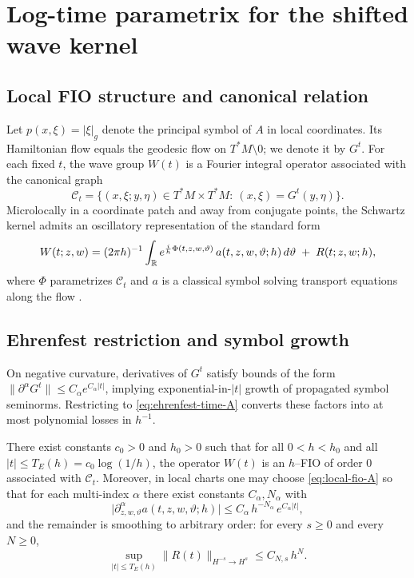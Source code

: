 \section{Log-time parametrix for the shifted wave kernel}\label{sec:ch5-parametrix}

\subsection{Local FIO structure and canonical relation}\label{subsec:ch5-fio}

Let $p(x,\xi)=|\xi|_g$ denote the principal symbol of $A$ in local coordinates. Its Hamiltonian flow equals the
geodesic flow on $T^*M\setminus 0$; we denote it by $G^t$. For each fixed $t$, the wave group $W(t)$ is a Fourier
integral operator associated with the canonical graph
\[
\mathcal C_t=\{(x,\xi;y,\eta)\in T^*M\times T^*M:\ (x,\xi)=G^t(y,\eta)\}.
\]
Microlocally in a coordinate patch and away from conjugate points, the Schwartz kernel admits an oscillatory
representation of the standard form
\begin{equation}\label{eq:local-fio-A}
W(t;z,w)
=(2\pi h)^{-1}\int_{\mathbb{R}} e^{\frac{i}{h}\Phi(t,z,w,\vartheta)}\,a(t,z,w,\vartheta;h)\,d\vartheta
\;+\;R(t;z,w;h),
\end{equation}
where $\Phi$ parametrizes $\mathcal C_t$ and $a$ is a classical symbol solving transport equations along the flow
\cite[Vol.~IV]{Hormander1985}.

\subsection{Ehrenfest restriction and symbol growth}\label{subsec:ch5-ehrenfest}

On negative curvature, derivatives of $G^t$ satisfy bounds of the form
$\|\partial^\alpha G^t\|\le C_\alpha e^{C_\alpha|t|}$, implying exponential-in-$|t|$ growth of propagated symbol
seminorms. Restricting to \eqref{eq:ehrenfest-time-A} converts these factors into at most polynomial losses in $h^{-1}$.

\begin{theorem}\label{thm:logtime-parametrix-A}
There exist constants $c_0>0$ and $h_0>0$ such that for all $0<h<h_0$ and all $|t|\le T_E(h)=c_0\log(1/h)$,
the operator $W(t)$ is an $h$--FIO of order $0$ associated with $\mathcal C_t$. Moreover, in local charts one may
choose \eqref{eq:local-fio-A} so that for each multi-index $\alpha$ there exist constants $C_\alpha,N_\alpha$ with
\begin{equation}\label{eq:amplitude-growth-A}
\big|\partial_{z,w,\vartheta}^\alpha a(t,z,w,\vartheta;h)\big|
\le C_\alpha\,h^{-N_\alpha}\,e^{C_\alpha|t|},
\end{equation}
and the remainder is smoothing to arbitrary order: for every $s\ge 0$ and every $N\ge 0$,
\begin{equation}\label{eq:smoothing-remainder-A}
\sup_{|t|\le T_E(h)}\|R(t)\|_{H^{-s}\to H^{s}}\le C_{N,s}\,h^{N}.
\end{equation}
\end{theorem}

